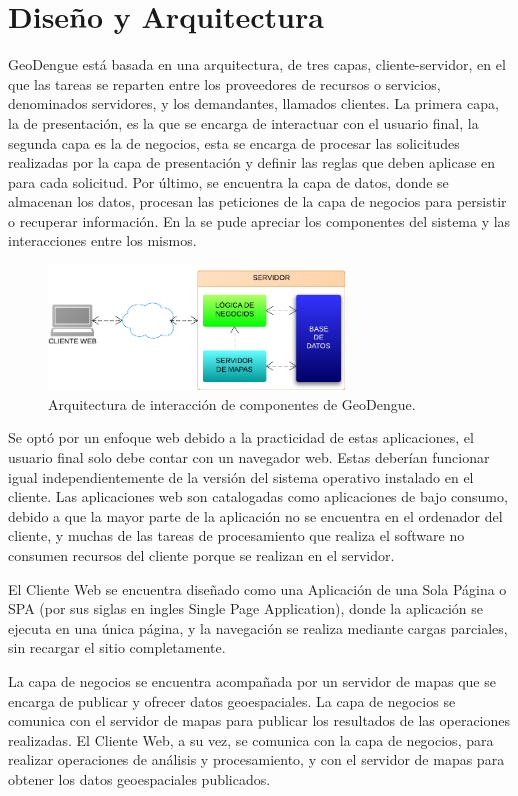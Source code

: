 \section{Diseño y Arquitectura}
GeoDengue está basada en una arquitectura, de tres capas, cliente-servidor, en el que las tareas
se reparten entre los proveedores de recursos o servicios, denominados servidores, y los
demandantes, llamados clientes. La primera capa, la de presentación, es la que se encarga de
interactuar con el usuario final, la segunda capa es la de negocios, esta se encarga de procesar
las solicitudes realizadas por la capa de presentación y definir las reglas que deben aplicase en
para cada solicitud. Por último, se encuentra la capa de datos, donde se almacenan los datos,
procesan las peticiones de la capa de negocios para persistir o recuperar información. En la
 se pude apreciar los componentes del sistema y las interacciones
entre los mismos.

\begin{figure}[!htpb]
\centering
\includegraphics[width=0.7\textwidth]{capitulo-5/graphics/arquitectura-completa.png}
\caption{\label{fig:arquitectura-completa}Arquitectura de interacción de componentes de GeoDengue.}
\end{figure}

Se optó por un enfoque web debido a la practicidad de estas aplicaciones, el usuario final solo
debe contar con un navegador web. Estas deberían funcionar igual independientemente de la versión
del sistema operativo instalado en el cliente. Las aplicaciones web son catalogadas como
aplicaciones de bajo consumo, debido a que la mayor parte de la aplicación no se encuentra en
el ordenador del cliente, y muchas de las tareas de procesamiento que realiza el software no
consumen recursos del cliente porque se realizan en el servidor.

El Cliente Web se encuentra diseñado como una Aplicación de una Sola Página o SPA (por sus siglas
en ingles Single Page Application), donde la aplicación se ejecuta en una única página, y la
navegación se realiza mediante cargas parciales, sin recargar el sitio completamente.

La capa de negocios se encuentra acompañada por un servidor de mapas que se encarga de publicar y
ofrecer datos geoespaciales. La capa de negocios se comunica con el servidor de mapas para
publicar los resultados de las operaciones realizadas. El Cliente Web, a su vez, se comunica con
la capa de negocios, para realizar operaciones de análisis y procesamiento, y con el servidor de
mapas para obtener los datos geoespaciales publicados.
